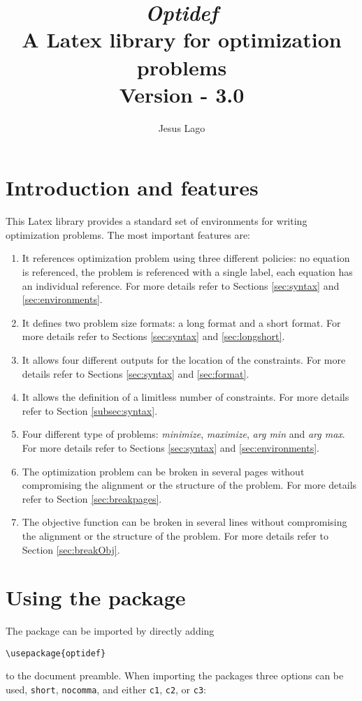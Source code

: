 \documentclass[a4paper]{article}
\title{\textit{\textbf{Optidef}} \\ A Latex library for optimization problems\\ \textnormal{Version - 3.0}}
\author{Jesus Lago}
\begin{document}
\maketitle

\newpage

\tableofcontents

\newpage

\section{Introduction and features}

This Latex library provides a standard set of environments for writing optimization problems. The most important features are:
\begin{enumerate}
\item It references optimization problem using three different policies: no equation is referenced, the problem is referenced with a single label, each equation has an individual reference. For more details refer to Sections \ref{sec:syntax} and \ref{sec:environments}.
\item It defines two problem size formats: a long format and a short format. For more details refer to Sections \ref{sec:syntax} and \ref{sec:longshort}.
\item It allows four different outputs for the location of the constraints. For more details refer to Sections \ref{sec:syntax} and \ref{sec:format}.
\item It allows the definition of a limitless number of constraints. For more details refer to Section \ref{subsec:syntax}.
\item Four different type of problems: \textit{minimize}, \textit{maximize}, \textit{arg min} and \textit{arg max}. For more details refer to Sections \ref{sec:syntax} and \ref{sec:environments}.
\item The optimization problem can be broken in several pages without compromising the alignment or the structure of the problem. For more details refer to Section \ref{sec:breakpages}. 
\item The objective function can be broken in several lines without compromising the alignment or the structure of the problem. For more details refer to Section \ref{sec:breakObj}.
\end{enumerate}

\section{Using the package}
The package can be imported by directly adding
\begin{lstlisting}
\usepackage{optidef}
\end{lstlisting}
to the document preamble. When importing the packages three options can be used, \verb|short|, \verb|nocomma|, and either \verb|c1|, \verb|c2|, or \verb|c3|:
\end{document}
